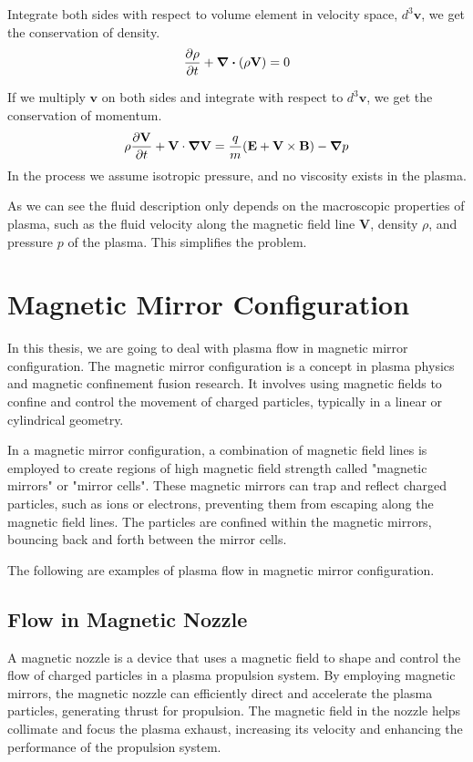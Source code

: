 Integrate both sides with respect to volume element in velocity space, $d^3\mathbf{v}$, we get the conservation of density.
\[ \pdv{\rho}{t} + \div(\rho\mathbf{V}) = 0 \]

If we multiply $\mathbf{v}$ on both sides and integrate with respect to $d^3\mathbf{v}$, we get the conservation of momentum.
\[ \rho\pdv{\mathbf{V}}{t} + \mathbf{V}\cdot\grad{\mathbf{V}} = \frac{q}{m}(\mathbf{E+V\times B}) - \grad{p} \]
In the process we assume isotropic pressure, and no viscosity exists in the plasma.

As we can see the fluid description only depends on the macroscopic properties of plasma, such as the fluid velocity along the magnetic field line $\mathbf{V}$, density $\rho$, and pressure $p$ of the plasma. This simplifies the problem.

\section{Magnetic Mirror Configuration}
In this thesis, we are going to deal with plasma flow in magnetic mirror configuration.
The magnetic mirror configuration is a concept in plasma physics and magnetic confinement fusion research. 
It involves using magnetic fields to confine and control the movement of charged particles, typically in a linear or cylindrical geometry.

In a magnetic mirror configuration, a combination of magnetic field lines is employed to create regions of high magnetic field strength called "magnetic mirrors" or "mirror cells".
These magnetic mirrors can trap and reflect charged particles, such as ions or electrons, preventing them from escaping along the magnetic field lines. 
The particles are confined within the magnetic mirrors, bouncing back and forth between the mirror cells.

The following are examples of plasma flow in magnetic mirror configuration.

\subsection{Flow in Magnetic Nozzle}
A magnetic nozzle is a device that uses a magnetic field to shape and control the flow of charged particles in a plasma propulsion system. By employing magnetic mirrors, the magnetic nozzle can efficiently direct and accelerate the plasma particles, generating thrust for propulsion. The magnetic field in the nozzle helps collimate and focus the plasma exhaust, increasing its velocity and enhancing the performance of the propulsion system.


